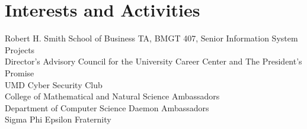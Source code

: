 \documentclass[a4paper,10pt]{article} %
\begin{document}

\section{Interests and Activities}
Robert H. Smith School of Business TA, BMGT 407, Senior Information System Projects\\
Director’s Advisory Council for the University Career Center and The President’s Promise\\
UMD Cyber Security Club\\
College of Mathematical and Natural Science Ambassadors\\
Department of Computer Science Daemon Ambassadors\\
Sigma Phi Epsilon Fraternity\\

\end{document}
